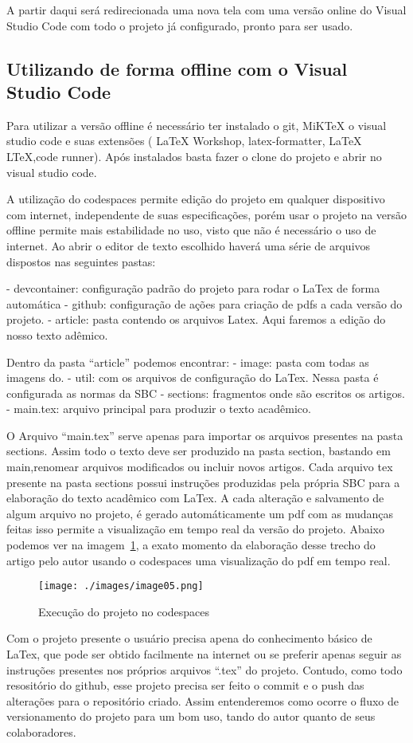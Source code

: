 A partir daqui será redirecionada uma nova tela com uma versão online do Visual Studio Code com todo o projeto já configurado, pronto para ser usado.

\subsection{Utilizando de forma offline com o Visual Studio Code}

Para utilizar a versão offline é necessário ter instalado o git, MiKTeX o visual studio code e suas extensões (
LaTeX Workshop, latex-formatter, LaTeX LTeX,code runner). Após instalados basta fazer o clone do projeto e abrir no visual studio code.


A utilização do codespaces permite edição do projeto em qualquer dispositivo com internet, independente de suas especificações, porém usar o projeto na versão offline permite mais estabilidade no uso, visto que não é necessário o uso de internet.
Ao abrir o editor de texto escolhido haverá uma série de arquivos dispostos nas seguintes pastas:

- devcontainer: configuração padrão do projeto para rodar o LaTex de forma automática
- github: configuração de ações para criação de pdfs a cada versão do projeto.
- article: pasta contendo os arquivos Latex. Aqui faremos a edição do nosso texto adêmico.

Dentro da pasta ``article'' podemos encontrar:
- image: pasta com todas as imagens do.
- util: com os arquivos de configuração do LaTex. Nessa pasta é configurada as normas da SBC
- sections: fragmentos onde são escritos os artigos.
- main.tex: arquivo principal para produzir o texto acadêmico.

O Arquivo ``main.tex'' serve apenas para importar os arquivos presentes na pasta sections. Assim todo o texto deve ser produzido na pasta section, bastando em main,renomear arquivos modificados ou incluir novos artigos. Cada arquivo tex presente na pasta sections possui instruções produzidas pela própria SBC para a elaboração do texto acadêmico com LaTex.
A cada alteração e salvamento de algum arquivo no projeto, é gerado automáticamente um pdf com as mudanças feitas isso permite a visualização em tempo real da versão do projeto.
Abaixo podemos ver na imagem~\ref{fig:image05}, a exato momento da elaboração desse trecho do artigo pelo autor usando o codespaces uma visualização do pdf em tempo real.

\begin{figure}[ht]
	\centering
	\texttt{[image: ./images/image05.png]}
	\caption{Execução do projeto no codespaces}
	\label{fig:image05}
\end{figure}

Com o projeto presente o usuário precisa apena do conhecimento básico de LaTex, que pode ser obtido facilmente na internet ou se preferir apenas seguir as instruções presentes nos próprios arquivos ``.tex'' do projeto.
Contudo, como todo resositório do github, esse projeto precisa ser feito o commit e o push das alterações para o repositório criado. Assim entenderemos como ocorre o fluxo de versionamento do projeto para um bom uso, tando do autor quanto de seus colaboradores.